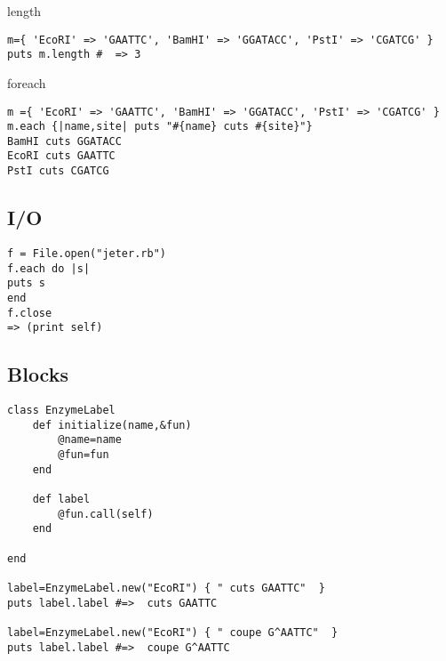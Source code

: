 \documentclass{article}
\begin{document}
length
\begin{lstlisting}
m={ 'EcoRI' => 'GAATTC', 'BamHI' => 'GGATACC', 'PstI' => 'CGATCG' }
puts m.length #  => 3
\end{lstlisting}


foreach
\begin{lstlisting}
m ={ 'EcoRI' => 'GAATTC', 'BamHI' => 'GGATACC', 'PstI' => 'CGATCG' }
m.each {|name,site| puts "#{name} cuts #{site}"}
BamHI cuts GGATACC
EcoRI cuts GAATTC
PstI cuts CGATCG
\end{lstlisting}

\subsection{I/O}
\begin{lstlisting}
f = File.open("jeter.rb")
f.each do |s|
puts s
end
f.close
=> (print self)
\end{lstlisting}

\subsection{Blocks}
\begin{lstlisting}
class EnzymeLabel
	def initialize(name,&fun)
		@name=name
		@fun=fun
	end
	
	def label
		@fun.call(self)
	end
	
end

label=EnzymeLabel.new("EcoRI") { " cuts GAATTC"  }
puts label.label #=>  cuts GAATTC

label=EnzymeLabel.new("EcoRI") { " coupe G^AATTC"  }
puts label.label #=>  coupe G^AATTC
\end{lstlisting}
\end{document}
